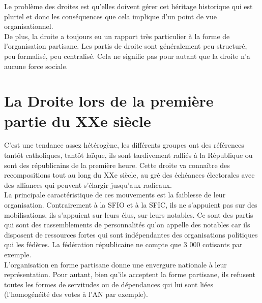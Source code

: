 \documentclass[10pt, a4paper, openany]{book}
\begin{document}
Le problème des droites est qu'elles doivent gérer cet héritage historique qui est pluriel et donc les conséquences que cela implique d'un point de vue organisationnel. \\
De plus, la droite a toujours eu un rapport très particulier à la forme de l'organisation partisane. Les partis de droite sont généralement peu structuré, peu formalisé, peu centralisé. Cela ne signifie pas pour autant que la droite n'a aucune force sociale. 


\section{La Droite lors de la première partie du XXe siècle}

C'est une tendance assez hétérogène, les différents groupes ont des références tantôt catholiques, tantôt laïque, ils sont tardivement ralliés à la République ou sont des républicains de la première heure. Cette droite va connaître des recompositions tout au long du XXe siècle, au gré des échéances électorales avec des alliances qui peuvent s'élargir jusqu'aux radicaux. \\
La principale caractéristique de ces mouvements est la faiblesse de leur organisation. Contrairement à la SFIO et à la SFIC, ils ne s'appuient pas sur des mobilisations, ils s'appuient sur leurs élus, sur leurs notables. Ce sont des partis qui sont des rassemblements de personnalités qu'on appelle des notables car ils disposent de ressources fortes qui sont indépendantes des organisations politiques qui les fédères. La fédération républicaine ne compte que 3 000 cotisants par exemple. \\
L'organisation en forme partisane donne une envergure nationale à leur représentation. Pour autant, bien qu'ils acceptent la forme partisane, ils refusent toutes les formes de servitudes ou de dépendances qui lui sont liées (l'homogénéité des votes à l'AN par exemple). 
\end{document}
